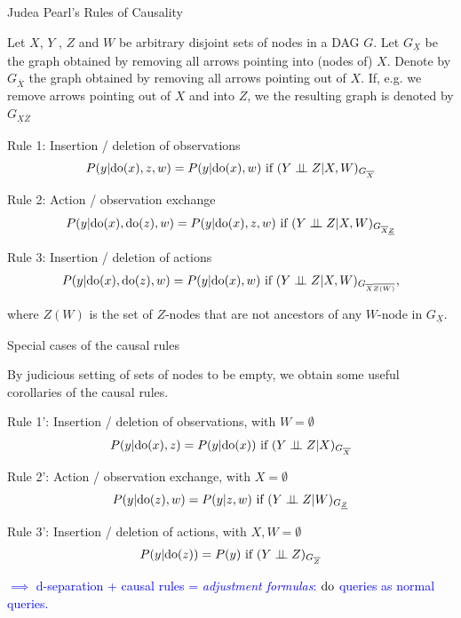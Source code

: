 \begin{frame}{Judea Pearl's Rules of Causality}

    Let $X$, $Y$ , $Z$ and $W$ be arbitrary disjoint sets of nodes in a DAG $G$. Let $G_\underline{X}$ be the graph obtained by removing all arrows pointing into (nodes of) $X$.
    Denote by $G_{\overline{X}}$ the graph obtained by removing all arrows pointing out of $X$. If, e.g. we remove arrows pointing out of $X$ and into $Z$, we the resulting graph is denoted by $G_{\underline{X} \overline{Z}}$

    Rule 1: Insertion / deletion of observations
    \begin{equation*}
        P(y | \mathrm{do}(x), z, w) = P(y | \mathrm{do}(x), w) \textrm{ if } (Y \perp\!\!\!\perp Z | X, W)_{G_{\overline{X}}}
    \end{equation*}

    Rule 2: Action / observation exchange
    \begin{equation*}
        P(y | \mathrm{do}(x), \mathrm{do}(z), w) = P(y | \mathrm{do}(x), z, w) \textrm{ if } (Y \perp\!\!\!\perp Z | X, W)_{G_{\overline{X} \underline{Z}}}
    \end{equation*}

    Rule 3: Insertion / deletion of actions
    \begin{equation*}
        P(y | \mathrm{do}(x), \mathrm{do}(z), w) = P(y | \mathrm{do}(x), w) \textrm{ if } (Y \perp\!\!\!\perp Z | X, W)_{G_{\overline{X} \overline{Z(W)}}},
    \end{equation*}

    where $Z(W)$ is the set of $Z$-nodes that are not ancestors of any $W$-node in $G_\underline{X}$.

\end{frame}


\begin{frame}{Special cases of the causal rules}

    By judicious setting of sets of nodes to be empty, we obtain some useful corollaries of the causal rules.
    \newline

    Rule 1': Insertion / deletion of observations, with $W = \emptyset$
    \begin{equation*}
        P(y | \mathrm{do}(x), z) = P(y | \mathrm{do}(x)) \textrm{ if } (Y \perp\!\!\!\perp Z | X)_{G_{\overline{X}}}
    \end{equation*}

    Rule 2': Action / observation exchange, with $X = \emptyset$
    \begin{equation*}
        P(y | \mathrm{do}(z), w) = P(y | z, w) \textrm{ if } (Y \perp\!\!\!\perp Z | W)_{G_{ \underline{Z}}}
    \end{equation*}

    Rule 3': Insertion / deletion of actions, with $X, W = \emptyset$
    \begin{equation*}
        P(y | \mathrm{do}(z)) = P(y) \textrm{ if } (Y \perp\!\!\!\perp Z )_{G_{\overline{Z}}}
    \end{equation*}

    \textcolor{blue}{$\implies$ d-separation + causal rules = \emph{adjustment formulas}: $\mathrm{do}$ queries as normal queries.}
\end{frame}


